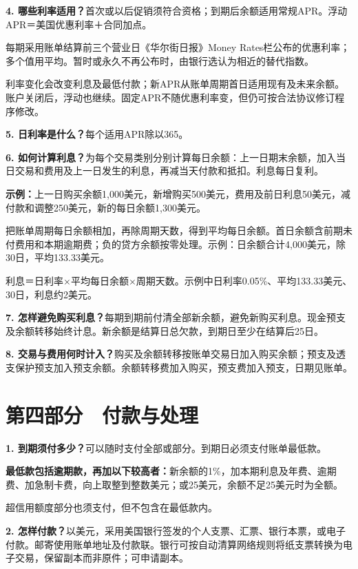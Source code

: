 \documentclass[UTF8,fontset=none,11pt,a4paper]{ctexart}
\begin{document}
\textbf{4. 哪些利率适用？}首次或以后促销须符合资格；到期后余额适用常规APR。浮动APR＝美国优惠利率＋\allowbreak\mbox{合同加点。}


每期采用账单结算前三个营业日《华尔街日报》Money Rates栏公布的优惠利率；多个值用平均。暂时或永久不再公布时，由银行选认为相近的\allowbreak\mbox{替代指数。}


利率变化会改变利息及最低付款；新APR从账单周期首日适用现有及未来余额。账户关闭后，浮动也继续。固定APR不随优惠利率变，但仍可按合法协议修订\allowbreak\mbox{程序修改。}


\textbf{5. 日利率是什么？}每个适用APR除以365。


\textbf{6. 如何计算利息？}为每个交易类别分别计算每日余额：上一日期末余额，加入当日交易和费用及上一日发生的利息，再减当天付款和抵扣。利息\allowbreak\mbox{每日复利。}


\textbf{示例：}上一日购买余额1,000美元，新增购买500美元，费用及前日利息50美元，减付款和调整250美元，新的每日余额1,300美元。


把账单周期每日余额相加，再除周期天数，得到平均每日余额。首日余额含前期未付费用和本期逾期费；负的贷方余额按零处理。示例：日余额合计4,000美元，除30日，平均133.33美元。


利息＝日利率×平均每日余额×周期天数。示例中日利率0.05\%、平均133.33美元、30日，利息约2美元。


\textbf{7. 怎样避免购买利息？}每期到期前付清全部新余额，避免新购买利息。现金预支及余额转移始终计息。新余额是结算日总欠款，到期日至少在结算后25日。


\textbf{8. 交易与费用何时计入？}购买及余额转移按账单交易日加入购买余额；预支及透支保护预支加入预支余额。余额转移费加入购买，预支费加入预支，日\allowbreak\mbox{期见账单。}


\section*{第四部分　付款与处理}
\textbf{1. 到期须付多少？}可以随时支付全部或部分。到期日必须支付账\allowbreak\mbox{单最低款。}


\textbf{最低款包括逾期款，再加以下较高者：}新余额的1\%，加本期利息及年费、逾期费、加急制卡费，向上取整到整数美元；或25美元，余额不足25美元\allowbreak\mbox{时为全额。}


超信用额度部分也须支付，但不包含在\allowbreak\mbox{最低款内。}


\textbf{2. 怎样付款？}以美元，采用美国银行签发的个人支票、汇票、银行本票，或电子付款。邮寄使用账单地址及付款联。银行可按自动清算网络规则将纸支票转换为电子交易，保留副本而非原件；可\allowbreak\mbox{申请副本。}
\end{document}
